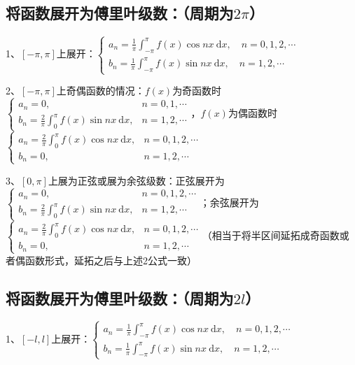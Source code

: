 \subsection{将函数展开为傅里叶级数：（周期为$2\pi$）}

1、$[-\pi, \pi]$上展开：$\left\{\begin{array}{l} a_{n}=\frac{1}{\pi} \int_{-\pi}^{\pi} f(x) \cos n x \mathrm{~d} x, \quad n=0,1,2, \cdots \\ b_{n}=\frac{1}{\pi} \int_{-\pi}^{\pi} f(x) \sin n x \mathrm{~d} x, \quad n=1,2, \cdots \end{array}\right.$

2、$[-\pi, \pi]$上奇偶函数的情况：$f(x)$为奇函数时$\begin{cases}a_{n}=0, & n=0,1, \cdots \\ b_{n}=\frac{2}{\pi} \int_{0}^{\pi} f(x) \sin n x \mathrm{~d} x, & n=1,2, \cdots\end{cases}$，$f(x)$为偶函数时$\begin{cases}a_{n}=\frac{2}{\pi} \int_{0}^{\pi} f(x) \cos n x \mathrm{~d} x, & n=0,1,2, \cdots \\ b_{n}=0, & n=1,2, \cdots\end{cases}$

3、$[0, \pi]$上展为正弦或展为余弦级数：正弦展开为$\begin{cases}a_{n}=0, & n=0,1,2, \cdots \\ b_{n}=\frac{2}{\pi} \int_{0}^{\pi} f(x) \sin n x \mathrm{~d} x, & n=1,2, \cdots\end{cases}$；余弦展开为$\begin{cases}a_{n}=\frac{2}{\pi} \int_{0}^{\pi} f(x) \cos n x \mathrm{~d} x, & n=0,1,2, \cdots \\ b_{n}=0, & n=1,2, \cdots\end{cases}$（相当于将半区间延拓成奇函数或者偶函数形式，延拓之后与上述2公式一致）



\subsection{将函数展开为傅里叶级数：（周期为$2l$）}

1、$[-l, l]$上展开：$\left\{\begin{array}{l} a_{n}=\frac{1}{\pi} \int_{-\pi}^{\pi} f(x) \cos n x \mathrm{~d} x, \quad n=0,1,2, \cdots \\ b_{n}=\frac{1}{\pi} \int_{-\pi}^{\pi} f(x) \sin n x \mathrm{~d} x, \quad n=1,2, \cdots \end{array}\right.$

